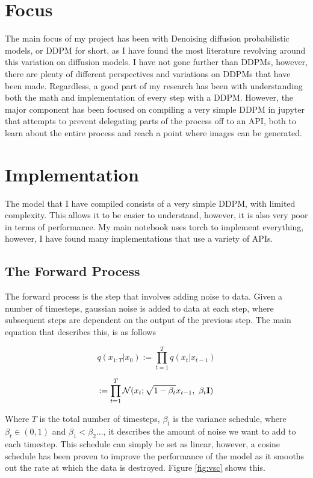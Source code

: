 \documentclass[conference]{IEEEtran}
\begin{document}
\section {Focus}

The main focus of my project has been with Denoising diffusion probabilistic
models, or DDPM for short, as I have found the most literature revolving around
this variation on diffusion models. I have not gone further than DDPMs,
however, there are plenty of different perspectives and variations on DDPMs
that have been made\cite{hugimpl}. Regardless, a good part of my research has
been with understanding both the math and implementation of every step with a
DDPM\cite{nain2022-2}\cite{nain2022-3}\cite{ho2020denoising}. However, the major component has been focused on compiling a very simple DDPM in jupyter that attempts to prevent delegating parts of the process off to an API, both to learn about the entire process and reach a point where images can be generated.

\section {Implementation}

The model that I have compiled consists of a very simple DDPM, with limited
complexity. This allows it to be easier to understand, however, it is also very
poor in terms of performance. My main notebook uses torch to implement
everything, however, I have found many implementations that use a variety of
APIs.

\subsection{The Forward Process}

The forward process is the step that involves adding noise to data. Given a
number of timesteps, gaussian noise is added to data at each step, where
subsequent steps are dependent on the output of the previous step. The main
equation that describes this, is as follows

$$
    q(x_{1:T}\vert x_{0})
    := \prod_{t=1}^{T}q(x_{t}\vert x_{t-1})
$$

$$
    :=\prod_{t=1}^{T}\mathcal{N}(x_{t};\sqrt{1-\beta_{t}} x_{t-1},\ \beta_{t}\bf I)
$$

Where $T$ is the total number of timesteps, $\beta_t$ is the variance schedule,
where $\beta_t \in (0,1)$ and $\beta_{1} < \beta_{2}...$, it describes the
amount of noise we want to add to each timestep. This schedule can simply be
set as linear, however, a cosine schedule has been proven to improve the
performance of the model\cite{nichol2021improved} as it smooths out the rate at
which the data is destroyed. Figure \ref{fig:vsc} shows this.
\end{document}
